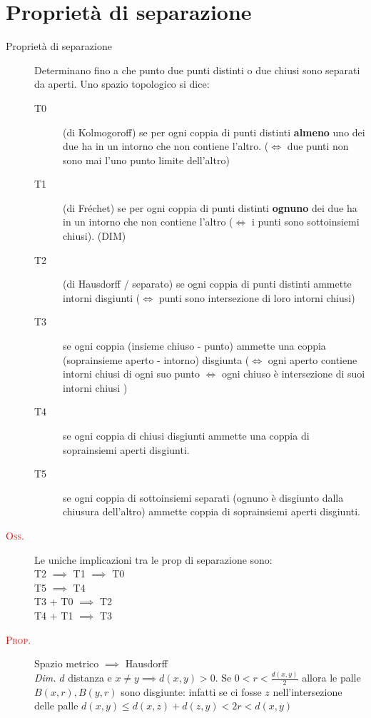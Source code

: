 \documentclass[a4paper,10pt]{article}
\newcommand{\myth}{\normalfont \scshape \textcolor{red}}
\theoremstyle{remark}
\theoremstyle{definition}
\begin{document}
\section*{Proprietà di separazione}
\begin{description}
    \item[Proprietà di separazione] Determinano fino a che punto due punti distinti o due chiusi sono separati da aperti. Uno spazio topologico si dice:
    \begin{description}
        \item[T0] (di Kolmogoroff) se per ogni coppia di punti distinti \textbf{almeno} uno dei due ha in un intorno che non contiene l'altro. ($\iff$ due punti non sono mai l'uno punto limite dell'altro)
        \item[T1] (di Fréchet) se per ogni coppia di punti distinti \textbf{ognuno} dei due ha in un intorno che non contiene l'altro ($\iff$ i punti sono sottoinsiemi chiusi). (DIM)
        \item[T2] (di Hausdorff / separato) se ogni coppia di punti distinti ammette intorni disgiunti ($\iff$ punti sono intersezione di loro intorni chiusi)
        \item[T3] se ogni coppia (insieme chiuso - punto) ammette una coppia (soprainsieme aperto - intorno) disgiunta ($\iff$ ogni aperto contiene intorni chiusi di ogni suo punto $\iff$ ogni chiuso è intersezione di suoi intorni chiusi )
        \item[T4] se ogni coppia di chiusi disgiunti ammette una coppia di soprainsiemi aperti disgiunti.
        \item[T5] se ogni coppia di sottoinsiemi separati (ognuno è disgiunto dalla chiusura dell'altro) ammette coppia di soprainsiemi aperti disgiunti.
    \end{description}
    \item[\myth{Oss.}] Le uniche implicazioni tra le prop di separazione sono: \\
    T2 $\implies$ T1 $\implies$ T0 \\
    T5 $\implies$ T4 \\
    T3 + T0 $\implies$ T2 \\
    T4 + T1 $\implies$ T3

    \item[\myth{Prop.}] Spazio metrico $\implies$ Hausdorff \\
        \textit{Dim.} $d$ distanza e $x \ne y \implies d(x,y) > 0$. Se $0<r<\frac{d(x,y)}{2}$ allora le palle $B(x,r),B(y,r)$ sono disgiunte: infatti se ci fosse $z$ nell'intersezione delle palle $d(x,y)  \le d(x,z)+d(z,y) < 2r < d(x,y)$
     

\end{description}
\end{document}
